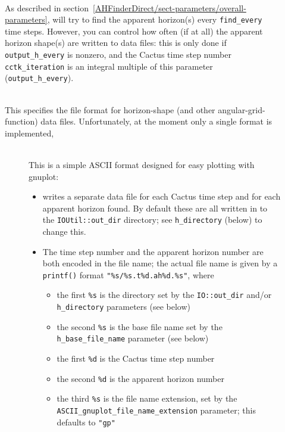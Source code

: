 \begin{description}
\item[]
\mbox{}\\
	As described in
	section~\ref{AHFinderDirect/sect-parameters/overall-parameters},
	 will try to find the apparent horizon(s)
	every \verb|find_every| time steps.  However, you can control
	how often (if at all) the apparent horizon shape(s) are written
	to data files: this is only done if \verb|output_h_every|
	is nonzero, and the Cactus time step number \verb|cctk_iteration|
	is an integral multiple of this parameter (\verb|output_h_every|).

\item[]
\mbox{}\\
	This specifies the file format for horizon-shape (and other
	angular-grid-function) data files.  Unfortunately, at the
	moment only a single format is implemented,
	\begin{description}
	\item[]
	\mbox{}\\
		This is a simple ASCII format designed for easy
		plotting with gnuplot:
		\begin{itemize}
		\item	{} writes a separate data file
			for each Cactus time step and for each apparent
			horizon found.  By default these are all written
			in to the \verb|IOUtil::out_dir| directory;
			see \verb|h_directory| (below) to change this.
		\item	The time step number and the apparent horizon number
			are both encoded in the file name; the actual
			file name is given by a \verb|printf()| format
			\verb|"%s/%s.t%d.ah%d.%s"|, where
			\begin{itemize}
			\item	the first \verb|%s| is the directory
				set by the \verb|IO::out_dir| and/or
				\verb|h_directory| parameters (see below)
			\item	the second \verb|%s| is the base file name
				set by the \verb|h_base_file_name|
				parameter (see below)
			\item	the first \verb|%d| is the
				Cactus time step number
			\item	the second \verb|%d| is the
				apparent horizon number
			\item	the third \verb|%s| is the
				file name extension, set by the
				\verb|ASCII_gnuplot_file_name_extension|
				parameter; this defaults to \verb|"gp"|

\end{itemize}
\end{itemize}
\end{description}
\end{description}
